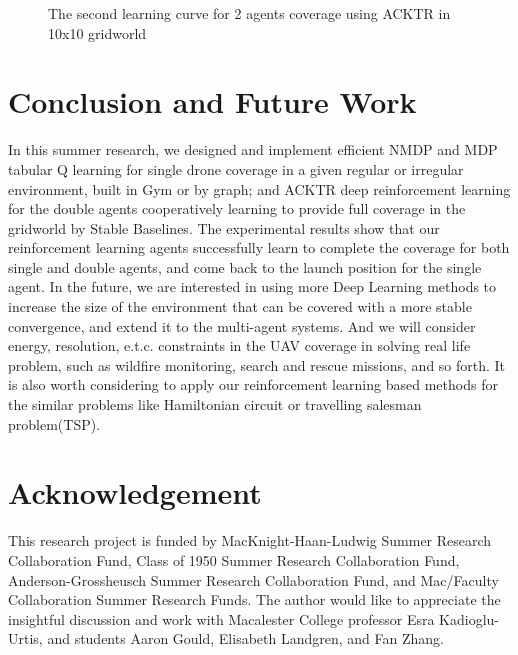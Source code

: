 \documentclass{article}
\begin{document}
\begin{figure}[H]
\begin{minipage}{0.49\textwidth}
     \caption{The second learning curve for 2 agents coverage using ACKTR in 10x10 gridworld}\label{Fig:Data2}
   \end{minipage}
\end{figure}



\section{Conclusion and Future Work}
\hspace{\parindent}In this summer research, we designed and implement efficient NMDP and MDP tabular Q learning for single drone coverage in a given regular or irregular environment, built in Gym or by graph; and ACKTR deep reinforcement learning for the double agents cooperatively learning to provide full coverage in the gridworld by Stable Baselines. The experimental results show that our reinforcement learning agents successfully learn to complete the coverage for both single and double agents, and come back to the launch position for the single agent. In the future, we are interested in using more Deep Learning methods to increase the size of the environment that can be covered with a more stable convergence, and extend it to the multi-agent systems. And we will consider energy, resolution, e.t.c. constraints in the UAV coverage in solving real life problem, such as wildfire monitoring, search and rescue missions, and so forth. It is also worth considering to apply our reinforcement learning based methods for the similar problems like Hamiltonian circuit or travelling salesman problem(TSP).

\section*{Acknowledgement}
\hspace{\parindent} This research project is funded by MacKnight-Haan-Ludwig Summer Research Collaboration Fund, Class of 1950 Summer Research Collaboration Fund, Anderson-Grossheusch Summer Research Collaboration Fund, and Mac/Faculty Collaboration Summer Research Funds. The author would like to appreciate the insightful discussion and work with Macalester College professor Esra Kadioglu-Urtis, and students Aaron Gould, Elisabeth Landgren, and Fan Zhang. 


\newpage


\end{document}

